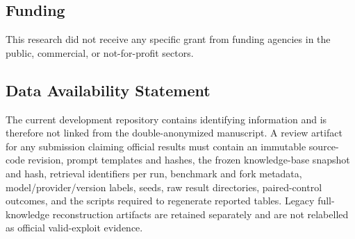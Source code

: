 \documentclass[a4paper]{cas-sc}
\begin{document}
\subsection*{Funding}
This research did not receive any specific grant from funding agencies in the public, commercial, or not-for-profit sectors.

\subsection*{Data Availability Statement}
The current development repository contains identifying information and is therefore not linked from the double-anonymized manuscript. A review artifact for any submission claiming official results must contain an immutable source-code revision, prompt templates and hashes, the frozen knowledge-base snapshot and hash, retrieval identifiers per run, benchmark and fork metadata, model/provider/version labels, seeds, raw result directories, paired-control outcomes, and the scripts required to regenerate reported tables. Legacy full-knowledge reconstruction artifacts are retained separately and are not relabelled as official valid-exploit evidence.




\end{document}
